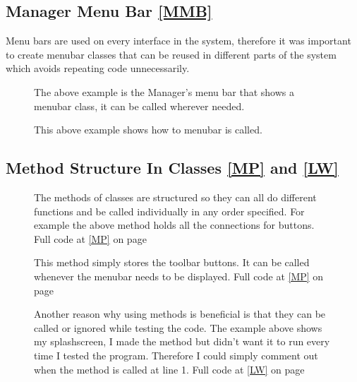 \subsection{Manager Menu Bar \ref{MMB}}

Menu bars are used on every interface in the system, therefore it was important to create menubar classes that can be reused in different parts of the system which avoids repeating code unnecessarily.  

\begin{figure}[H]
    \caption{The above example is the Manager's menu bar that shows a menubar class, it can be called wherever needed.} \label{fig:Dialog Class}
\end{figure}

\begin{figure}[H]
    \caption{This above example shows how to menubar is called.} \label{fig:Dialog Class}
\end{figure}

\subsection{Method Structure In Classes \ref{MP} and \ref{LW}}
 
 \begin{figure}[H]
	\begin{scriptsize}
	 \end{scriptsize}
    \caption{The methods of classes are structured so they can all do different functions and be called individually in any order specified. For example the above method holds all the connections for buttons. Full code at \ref{MP} on page \pageref{MP}} \label{fig:Dialog Class}
\end{figure}

 \begin{figure}[H]
    \caption{This method simply stores the toolbar buttons. It can be called whenever the menubar needs to be displayed. Full code at \ref{MP} on page \pageref{MP}} \label{fig:Dialog Class}
\end{figure}

 \begin{figure}[H]
    \caption{Another reason why using methods is beneficial is that they can be called or ignored while testing the code. The example above shows my splashscreen, I made the method but didn't want it to run every time I tested the program. Therefore I could simply comment out when the method is called at line 1. Full code at \ref{LW} on page \pageref{LW} } \label{fig:Dialog Class}
\end{figure}

